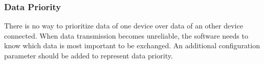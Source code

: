 \subsubsection{Data Priority}
There is no way to prioritize data of one device over data of an other device connected. When data transmission becomes unreliable, the software needs to know which data is most important to be exchanged. An additional configuration parameter should be added to represent data priority.\\